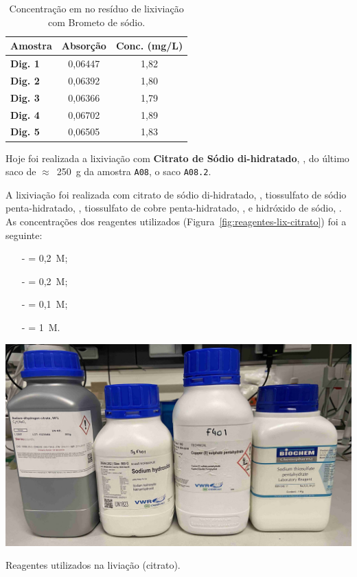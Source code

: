\begin{table}[!ht]
    \centering
    \begin{tabularx}{\textwidth}{@{}lCC@{}}
        \toprule
        \textbf{Amostra} & \textbf{Absorção} & \textbf{Conc. (mg/L)} \\ \midrule
        \textbf{Dig. 1}  & 0,06447 & 1,82 \\
        \textbf{Dig. 2}  & 0,06392 & 1,80 \\
        \textbf{Dig. 3}  & 0,06366 & 1,79 \\
        \textbf{Dig. 4}  & 0,06702 & 1,89 \\
        \textbf{Dig. 5}  & 0,06505 & 1,83 \\\bottomrule
    \end{tabularx}
    \caption{Concentração em  no resíduo de lixiviação com Brometo de sódio.}
    \label{tab:aas-concentracao-au-res-bromo}
\end{table}

\hrulefill


\label{day:29-novembro-2024}

Hoje foi realizada a lixiviação com \textbf{Citrato de Sódio di-hidratado}, \citratodi{}, do último saco de $\approx$~250~g da amostra \texttt{A08}, o saco \texttt{A08.2}.

A lixiviação foi realizada com citrato de sódio di-hidratado, \citratodi{}, tiossulfato de sódio penta-hidratado, \tsp{}, tiossulfato de cobre penta-hidratado, \sulfcu{}, e hidróxido de sódio, \hidso{}.
As concentrações dos reagentes utilizados (Figura~\ref{fig:reagentes-lix-citrato}) foi a seguinte:
\begin{itemize}
    \item[-] \citratodi{} = 0,2~M;
    \item[-] \tsp{} = 0,2~M;
    \item[-] \sulfcu{} = 0,1~M;
    \item[-] \hidso{} = 1~M.
\end{itemize}

\begin{marginfigure}[-3cm]
    \centering
    \includegraphics[width=0.9\linewidth]{figures/reagentes lixiviação citrato.jpg}
    \caption{Reagentes utilizados na liviação (citrato).}
    \label{fig:reagentes-lix-citrato}
\end{marginfigure}

